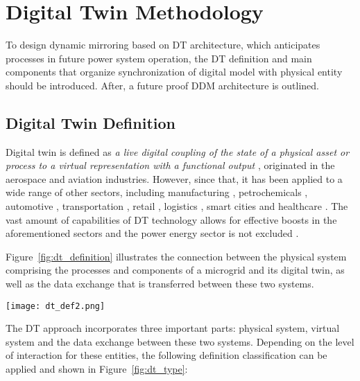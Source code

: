 \chapter{Digital Twin Methodology}\label{ch:ch2}

To design dynamic mirroring based on DT architecture, which anticipates processes in future power system operation, the DT definition and main components that organize synchronization of digital model with physical entity should be introduced. After, a future proof DDM architecture is outlined.

\section{Digital Twin Definition}\label{sec:ch2/sec1}

Digital twin is defined as \emph{a live digital coupling of the state of a physical asset or process to a virtual representation with a functional output} \autocite{jrn_catapult_2021}, originated in the aerospace and aviation industries. However, since that, it has been applied to a wide range of other sectors, including manufacturing  \autocite{conf_moller_2021}, petrochemicals \autocite{jrn_sircar_2023}, automotive \autocite{conf_biesinger_2019}, transportation \autocite{conf_gao_2021}, retail \autocite{conf_maizi_2019}, logistics \autocite{jrn_abideen_2021}, smart cities \autocite{jrn_wang_2023} and healthcare \autocite{jrn_mihai_2022}. The vast amount of capabilities of DT technology allows for effective boosts in the aforementioned sectors and the power energy sector is not excluded \autocite{jrn_bazmohammadi_2022}. %

Figure~\cref{fig:dt_definition} illustrates the connection between the physical system comprising the processes and components of a microgrid and its digital twin, as well as the data exchange that is transferred between these two systems.

\begin{figure*}[htbp]
    \centering
    \texttt{[image: dt\_def2.png]}
    \caption{Simplified illustration of digital twin definition.}
    \label{fig:dt_definition}
\end{figure*}

The DT approach incorporates three important parts: physical system, virtual system and the data exchange between these two systems. Depending on the level of interaction for these entities, the following definition classification can be applied \autocite{9103025} and shown in Figure~\cref{fig:dt_type}:

